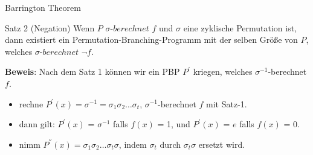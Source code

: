 \documentclass{beamer}
\begin{document}
\begin{frame}{Barrington Theorem}
\begin{block}{Satz 2 (Negation)}
Wenn $P$ $\sigma$-$berechnet$ $f$ und $\sigma$ eine zyklische Permutation ist, dann existiert ein Permutation-Branching-Programm mit der selben Größe von $P$, welches $\sigma$-$berechnet$ $\lnot f$.
\end{block}
\textbf{Beweis}: Nach dem Satz 1 können wir ein PBP $P^{'}$ kriegen, welches $\sigma^{-1}$-berechnet $f$.
\begin{itemize}
\item rechne $P^{'}(x) = \sigma^{-1} = \sigma_1\sigma_2\dots\sigma_t$, $\sigma^{-1}$-berechnet $f$ mit Satz-1.
\item dann gilt: $P^{'}(x)$ = $\sigma^{-1}$ falls $f(x)$ = 1, und $P^{'}(x)$ = $e$ falls $f(x)$ = 0.
\item nimm $P^{''}(x) = \sigma_1\sigma_2\dots\sigma_t\sigma$, indem $\sigma_t$ durch $\sigma_t\sigma$ ersetzt wird. 
\end{itemize} 


\end{frame}
\end{document}
